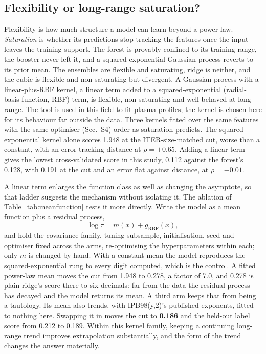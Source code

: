 \documentclass[aip,pop,preprint,amsmath,amssymb]{revtex4-2}
\begin{document}
\subsection{Flexibility or long-range saturation?}
\label{sec:gp}

Flexibility is how much structure a model can learn beyond a power law.
\emph{Saturation} is whether its predictions stop tracking the features once the
input leaves the training support. The forest is provably confined to its
training range, the booster never left it, and a squared-exponential Gaussian
process reverts to its prior mean. The ensembles are flexible and saturating,
ridge is neither, and the cubic is flexible and non-saturating but divergent. A
Gaussian process\cite{gpml} with a linear-plus-RBF kernel, a linear term added
to a squared-exponential (radial-basis-function, RBF) term, is flexible,
non-saturating and well behaved at long range. The tool is used in this field
to fit plasma profiles\cite{chilenski}; the kernel is chosen here for its
behaviour far outside the data. Three kernels fitted over the same features with
the same optimiser (Sec.~S4) order as saturation predicts. The
squared-exponential kernel alone scores 1.948 at the ITER-size-matched cut, worse
than a constant, with an error tracking distance at $\rho=+0.65$. Adding a
linear term gives the lowest cross-validated score in this study, 0.112 against
the forest's 0.128, with 0.191 at the cut and an error flat against distance, at
$\rho=-0.01$.

A linear term enlarges the function class as well as changing the asymptote, so
that ladder suggests the mechanism without isolating it. The ablation of
Table~\ref{tab:meanfunction} tests it more directly. Write the model as a mean
function
plus a residual process,
\begin{equation}
\log\tau = m(x) + g_{\text{RBF}}(x),
\label{eq:meanfunction}
\end{equation}
and hold the covariance family, tuning subsample, initialisation, seed and
optimiser fixed across the arms, re-optimising the hyperparameters within each;
only $m$ is changed by hand. With a constant mean the model
reproduces the squared-exponential rung to every digit computed, which is the
control. A fitted power-law mean moves the cut from 1.948 to 0.278, a factor of
7.0, and 0.278 is plain ridge's score there to six decimals: far from the data
the residual process has decayed and the model returns its mean. A third arm
keeps that from being a tautology. Its mean also trends, with IPB98(y,2)'s
published exponents, fitted to nothing here. Swapping it in moves the cut to
\textbf{0.186} and the held-out label score from 0.212 to 0.189. Within this
kernel family, keeping a continuing long-range trend improves extrapolation
substantially, and the form of the trend changes the answer materially.
\end{document}
